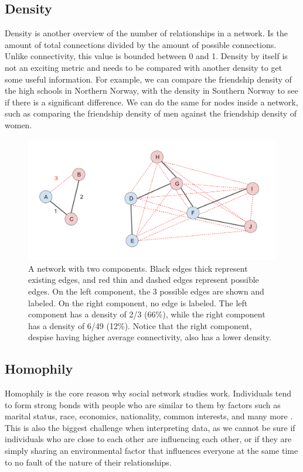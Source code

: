 \subsection{Density}

Density is another overview of the number of relationships in a network. Is the amount of total connections divided by the amount of possible connections. Unlike connectivity, this value is bounded between 0 and 1. Density by itself is not an exciting metric and needs to be compared with another density to get some useful information. For example, we can compare the friendship density of the high schools in Northern Norway, with the density in Southern Norway to see if there is a significant difference. We can do the same for nodes inside a network, such as comparing the friendship density of men against the friendship density of women.

    \begin{figure}[h!]
        \centering
            \includegraphics[width=0.7\linewidth]{figures/Networks/Concepts/edgesDensity.png} 
        \caption{A network with two components. Black edges thick represent existing edges, and red thin and dashed edges represent possible edges. On the left component, the 3 possible edges are shown and labeled. On the right component, no edge is labeled. The left component has a density of 2/3 (66\%), while the right component has a density of 6/49 (12\%). Notice that the right component, despise having higher average connectivity, also has a lower density.}
        \label{figure:networksDensity}
    \end{figure}    


\subsection{Homophily}
\label{network:homophily}

Homophily is the core reason why social network studies work. Individuals tend to form strong bonds with people who are similar to them by factors such as marital status, race, economics, nationality, common interests, and many more \cite{Stehl2013, Moody2001, Qian2007, Cheadle2012, McPherson1987, Sergio2009, Kossinets2009, McPherson2001, Smith2014, Karimi2018, Lee2019, Avin2020, Asikainen2020}. This is also the biggest challenge when interpreting data, as we cannot be sure if individuals who are close to each other are influencing each other, or if they are simply sharing an environmental factor that influences everyone at the same time to no fault of the nature of their relationships.

